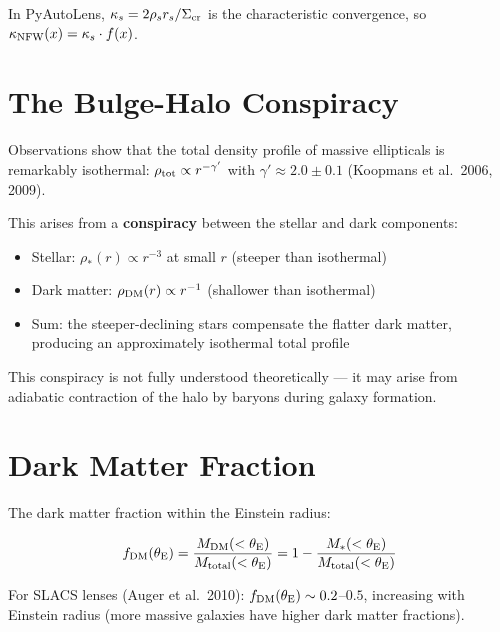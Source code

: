 \documentclass[11pt, letterpaper]{article}
\begin{document}
In PyAutoLens, $\kappa_s = 2\rho_s r_s / \Sigma_{\rm cr}$ is the characteristic
convergence, so $\kappa_{\rm NFW}(x) = \kappa_s \cdot f(x)$.

\section{The Bulge-Halo Conspiracy}
\label{sec:conspiracy}

Observations show that the total density profile of massive ellipticals
is remarkably isothermal: $\rho_{\rm tot} \propto r^{-\gamma'}$ with
$\gamma' \approx 2.0 \pm 0.1$ (Koopmans et al.\ 2006, 2009).

This arises from a \textbf{conspiracy} between the stellar and dark
components:
\begin{itemize}[nosep]
  \item Stellar: $\rho_*(r) \propto r^{-3}$ at small $r$ (steeper than isothermal)
  \item Dark matter: $\rho_{\rm DM}(r) \propto r^{-1}$ (shallower than isothermal)
  \item Sum: the steeper-declining stars compensate the flatter dark matter,
    producing an approximately isothermal total profile
\end{itemize}

This conspiracy is not fully understood theoretically --- it may arise from
adiabatic contraction of the halo by baryons during galaxy formation.

\section{Dark Matter Fraction}
\label{sec:dm-fraction}

The dark matter fraction within the Einstein radius:
\begin{keyresult}
\begin{equation}
f_{\rm DM}(\theta_{\rm E}) = \frac{M_{\rm DM}(<\theta_{\rm E})}{M_{\rm total}(<\theta_{\rm E})}
= 1 - \frac{M_*(<\theta_{\rm E})}{M_{\rm total}(<\theta_{\rm E})}
\label{eq:fdm}
\end{equation}
\end{keyresult}

For SLACS lenses (Auger et al.\ 2010): $f_{\rm DM}(\theta_{\rm E}) \sim 0.2$--$0.5$,
increasing with Einstein radius (more massive galaxies have higher dark
matter fractions).
\end{document}
